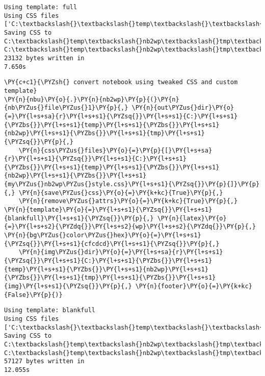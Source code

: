     \begin{Verbatim}[commandchars=\\\{\}]
Using template: full
Using CSS files ['C:\textbackslash{}\textbackslash{}temp\textbackslash{}\textbackslash{}nb2wp\textbackslash{}\textbackslash{}style.css']
Saving CSS to C:\textbackslash{}temp\textbackslash{}nb2wp\textbackslash{}tmp\textbackslash{}style.css
C:\textbackslash{}temp\textbackslash{}nb2wp\textbackslash{}tmp\textbackslash{}TweakingJupyterExportTemplates0.html: 23132 bytes written in
7.650s
    \end{Verbatim}

    \begin{tcolorbox}[breakable, size=fbox, boxrule=1pt, pad at break*=1mm,colback=cellbackground, colframe=cellborder]
\begin{Verbatim}[commandchars=\\\{\}]
\PY{c+c1}{\PYZsh{} convert notebook using tweaked CSS and custom template}
\PY{n}{nbu}\PY{o}{.}\PY{n}{nb2wp}\PY{p}{(}\PY{n}{nb\PYZus{}file\PYZus{}1}\PY{p}{,} \PY{n}{out\PYZus{}dir}\PY{o}{=}\PY{l+s+sa}{r}\PY{l+s+s1}{\PYZsq{}}\PY{l+s+s1}{C:}\PY{l+s+s1}{\PYZbs{}}\PY{l+s+s1}{temp}\PY{l+s+s1}{\PYZbs{}}\PY{l+s+s1}{nb2wp}\PY{l+s+s1}{\PYZbs{}}\PY{l+s+s1}{tmp}\PY{l+s+s1}{\PYZsq{}}\PY{p}{,}
    \PY{n}{css\PYZus{}files}\PY{o}{=}\PY{p}{[}\PY{l+s+sa}{r}\PY{l+s+s1}{\PYZsq{}}\PY{l+s+s1}{C:}\PY{l+s+s1}{\PYZbs{}}\PY{l+s+s1}{temp}\PY{l+s+s1}{\PYZbs{}}\PY{l+s+s1}{nb2wp}\PY{l+s+s1}{\PYZbs{}}\PY{l+s+s1}{my\PYZus{}nb2wp\PYZus{}style.css}\PY{l+s+s1}{\PYZsq{}}\PY{p}{]}\PY{p}{,} \PY{n}{save\PYZus{}css}\PY{o}{=}\PY{k+kc}{True}\PY{p}{,} 
    \PY{n}{remove\PYZus{}attrs}\PY{o}{=}\PY{k+kc}{True}\PY{p}{,} \PY{n}{template}\PY{o}{=}\PY{l+s+s1}{\PYZsq{}}\PY{l+s+s1}{blankfull}\PY{l+s+s1}{\PYZsq{}}\PY{p}{,} \PY{n}{latex}\PY{o}{=}\PY{l+s+s2}{\PYZdq{}}\PY{l+s+s2}{wp}\PY{l+s+s2}{\PYZdq{}}\PY{p}{,} \PY{n}{bg\PYZus{}color\PYZus{}hex}\PY{o}{=}\PY{l+s+s1}{\PYZsq{}}\PY{l+s+s1}{cfcdcd}\PY{l+s+s1}{\PYZsq{}}\PY{p}{,}
    \PY{n}{img\PYZus{}dir}\PY{o}{=}\PY{l+s+sa}{r}\PY{l+s+s1}{\PYZsq{}}\PY{l+s+s1}{C:}\PY{l+s+s1}{\PYZbs{}}\PY{l+s+s1}{temp}\PY{l+s+s1}{\PYZbs{}}\PY{l+s+s1}{nb2wp}\PY{l+s+s1}{\PYZbs{}}\PY{l+s+s1}{tmp}\PY{l+s+s1}{\PYZbs{}}\PY{l+s+s1}{img}\PY{l+s+s1}{\PYZsq{}}\PY{p}{,} \PY{n}{footer}\PY{o}{=}\PY{k+kc}{False}\PY{p}{)}
\end{Verbatim}
\end{tcolorbox}

    \begin{Verbatim}[commandchars=\\\{\}]
Using template: blankfull
Using CSS files ['C:\textbackslash{}\textbackslash{}temp\textbackslash{}\textbackslash{}nb2wp\textbackslash{}\textbackslash{}my\_nb2wp\_style.css']
Saving CSS to C:\textbackslash{}temp\textbackslash{}nb2wp\textbackslash{}tmp\textbackslash{}style.css
C:\textbackslash{}temp\textbackslash{}nb2wp\textbackslash{}tmp\textbackslash{}TweakingJupyterExportTemplates1.html: 57127 bytes written in
12.055s
    \end{Verbatim}



    
    
    
%
